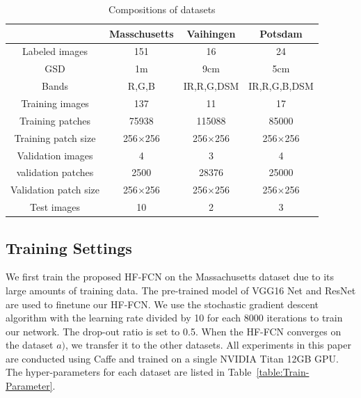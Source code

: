 \begin{table}
\setlength{\belowcaptionskip}{-2cm} 
 \centering
 \caption{Compositions of datasets}
 \label{table:dataset-composition}
 \begin{tabular}{c|ccc}
\hline
& Masschusetts & Vaihingen & Potsdam\\  \hline
Labeled images & 151& 16 &24\\ \hline
GSD & 1m & 9cm & 5cm\\ \hline
Bands & R,G,B & IR,R,G,DSM & IR,R,G,B,DSM\\ \hline
Training images &137 & 11 & 17\\ \hline
Training patches&75938 &115088 &85000\\ \hline
Training patch size& 256$\times$256 & 256$\times$256 & 256$\times$256\\ \hline
Validation images & 4 & 3 & 4\\ \hline
validation patches &2500 & 28376 &25000 \\\hline
Validation patch size & 256$\times$256 & 256$\times$256 & 256$\times$256\\ \hline
Test images & 10 & 2 & 3\\ \hline
\end{tabular}
\end {table}



\subsection{Training Settings}
We first train the proposed HF-FCN on the Massachusetts dataset due to its large amounts of training data. The pre-trained model of VGG16 Net and ResNet  are used to finetune our HF-FCN. 
%
We use the stochastic gradient descent algorithm with the learning rate divided by 10 for each 8000 iterations to train our network. 
%
The drop-out ratio is set to 0.5.
% 
When the HF-FCN converges on the dataset ${a)}$, we transfer it to the other datasets. 
%
All experiments in this paper are conducted using Caffe and trained on a single NVIDIA Titan 12GB GPU. 
The hyper-parameters for each dataset are listed in Table~\ref{table:Train-Parameter}.

